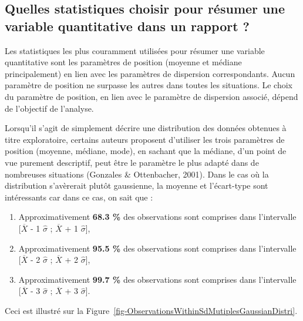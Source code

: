 \documentclass[
  letterpaper,
]{book}
\providecommand{\tightlist}{%
  \setlength{\itemsep}{0pt}\setlength{\parskip}{0pt}}\usepackage{longtable,booktabs,array}
\begin{document}
\subsection{Quelles statistiques choisir pour résumer une variable
quantitative dans un rapport
?}\label{quelles-statistiques-choisir-pour-ruxe9sumer-une-variable-quantitative-dans-un-rapport}

Les statistiques les plus couramment utilisées pour résumer une variable
quantitative sont les paramètres de position (moyenne et médiane
principalement) en lien avec les paramètres de dispersion
correspondants. Aucun paramètre de position ne surpasse les autres dans
toutes les situations. Le choix du paramètre de position, en lien avec
le paramètre de dispersion associé, dépend de l'objectif de l'analyse.

Lorsqu'il s'agit de simplement décrire une distribution des données
obtenues à titre exploratoire, certains auteurs proposent d'utiliser les
trois paramètres de position (moyenne, médiane, mode), en sachant que la
médiane, d'un point de vue purement descriptif, peut être le paramètre
le plus adapté dans de nombreuses situations (Gonzales \& Ottenbacher,
2001). Dans le cas où la distribution s'avèrerait plutôt gaussienne, la
moyenne et l'écart-type sont intéressants car dans ce cas, on sait que :

\begin{enumerate}
\def\labelenumi{\arabic{enumi}.}
\tightlist
\item
  Approximativement \textbf{68.3 \%} des observations sont comprises
  dans l'intervalle {[}\(\overline{X}\) - 1 \(\hat{\sigma}\) ;
  \(\overline{X}\) + 1 \(\hat{\sigma}\){]},
\item
  Approximativement \textbf{95.5 \%} des observations sont comprises
  dans l'intervalle {[}\(\overline{X}\) - 2 \(\hat{\sigma}\) ;
  \(\overline{X}\) + 2 \(\hat{\sigma}\){]},
\item
  Approximativement \textbf{99.7 \%} des observations sont comprises
  dans l'intervalle {[}\(\overline{X}\) - 3 \(\hat{\sigma}\) ;
  \(\overline{X}\) + 3 \(\hat{\sigma}\){]}.
\end{enumerate}

Ceci est illustré sur la
Figure~\ref{fig-ObservationsWithinSdMutiplesGaussianDistri}.
\end{document}
